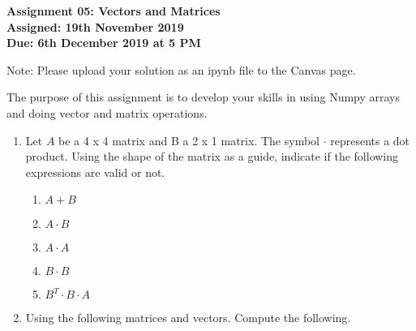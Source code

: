 \documentclass[a4paper,12pt]{article}
\begin{document}
\begin{centering}
	\textbf{
		Assignment 05: Vectors and Matrices\\
		Assigned: 19th November 2019\\
		Due: 6th December 2019 at 5 PM\\
	}
\end{centering}


Note: Please upload your solution as an ipynb file to the Canvas page.

\vspace{1em}
 
 The purpose of this assignment is to develop your skills in using Numpy arrays and doing vector and matrix operations.
 
\begin{enumerate}
	\item Let $A$ be a 4 x 4 matrix and B a 2 x 1 matrix. The symbol $\cdot$ represents a dot product. Using the shape of the matrix as a guide, indicate if the following expressions are valid or not.
	\begin{enumerate}
		\item $ A + B$
		\item $ A \cdot B$
		\item $ A \cdot A$
		\item $ B \cdot B$
		\item $ B^T \cdot B \cdot A$
	\end{enumerate}

	\item Using the following matrices and vectors. Compute the following.
	

\end{enumerate}
\end{document}

